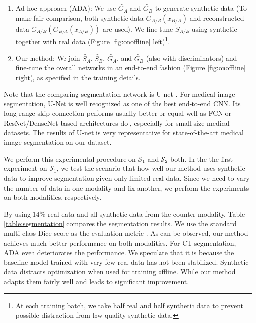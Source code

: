 \documentclass[10pt,twocolumn,letterpaper]{article}
\begin{document}
\begin{enumerate}[topsep=0pt]
	\item Ad-hoc approach (ADA): We use $\tilde{G_A}$ and $\tilde{G_B}$ to generate synthetic data (To make fair comparison, both synthetic data  $G_{A/B}(x_{B/A})$ and reconstructed data $G_{A/B}(G_{B/A}(x_{A/B}))$ are used). We fine-tune $\tilde{S}_{A/B}$ using synthetic together with real data (Figure \ref{fig:onoffline} left)\footnote{At each training batch, we take half real and half synthetic data to prevent possible distraction from low-quality synthetic data.}. 
	\item Our method: We join $\tilde{S_A}$,  $\tilde{S_B}$, $\tilde{G_A}$, and $\tilde{G_B}$ (also with discriminators) and fine-tune the overall networks in an end-to-end fashion (Figure \ref{fig:onoffline} right), as specified in the training details. 
\end{enumerate}
Note that the comparing segmentation network is U-net \cite{ronneberger2015u}. For medical image segmentation, U-Net is well recognized as one of the best end-to-end CNN. Its long-range skip connection performs usually better or equal well as FCN or ResNet/DenseNet based architectures do \cite{drozdzal2016importance}, especially for small size medical datasets. The results of U-net is very representative for state-of-the-art medical image segmentation on our dataset. 

We perform this experimental procedure on $\mathcal{S}_1$ and $\mathcal{S}_2$ both.
In the the first experiment on $\mathcal{S}_1$,
we test the scenario that how well our method uses synthetic data to improve segmentation given only limited real data. Since we need to vary the number of data in one modality and fix another, we perform the experiments on both modalities, respectively. 

By using $14\%$  real data and all synthetic data from the counter modality, Table \ref{table:segmentation} compares the segmentation results. We use the standard multi-class Dice score as the evaluation metric \cite{dice1945measures}.
As can be observed, our method achieves much better performance on both modalities. For CT segmentation, ADA even deteriorates the performance.  We speculate that it is because the baseline model trained with very few real data has not been stabilized. Synthetic data distracts optimization when used for training offline. While our method adapts them fairly well and leads to significant improvement.
\end{document}
